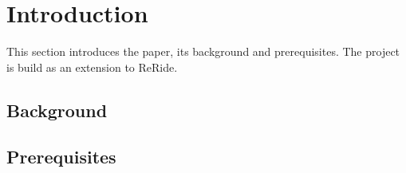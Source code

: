 \section{Introduction}
This section introduces the paper, its background and prerequisites. The project is build as an extension to ReRide\cite{article:reride}.

\subsection{Background}

\subsection{Prerequisites}